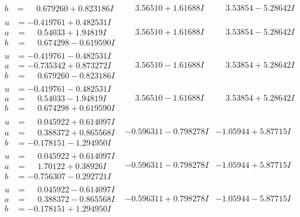 \documentclass[1p]{elsarticle_modified}
\theoremstyle{definition}
\begin{document}
$$\begin{array}{c|c|c}
\begin{aligned}
b &= \phantom{-}0.679260 + 0.823186 I\end{aligned}
 & \phantom{-}3.56510 + 1.61688 I & \phantom{-}3.53854 - 5.28642 I \\ \hline\begin{aligned}
u &= -0.419761 + 0.482531 I \\
a &= \phantom{-}0.54033 + 1.94819 I \\
b &= \phantom{-}0.674298 - 0.619590 I\end{aligned}
 & \phantom{-}3.56510 + 1.61688 I & \phantom{-}3.53854 - 5.28642 I \\ \hline\begin{aligned}
u &= -0.419761 - 0.482531 I \\
a &= -0.735342 + 0.873272 I \\
b &= \phantom{-}0.679260 - 0.823186 I\end{aligned}
 & \phantom{-}3.56510 - 1.61688 I & \phantom{-}3.53854 + 5.28642 I \\ \hline\begin{aligned}
u &= -0.419761 - 0.482531 I \\
a &= \phantom{-}0.54033 - 1.94819 I \\
b &= \phantom{-}0.674298 + 0.619590 I\end{aligned}
 & \phantom{-}3.56510 - 1.61688 I & \phantom{-}3.53854 + 5.28642 I \\ \hline\begin{aligned}
u &= \phantom{-}0.045922 + 0.614097 I \\
a &= \phantom{-}0.388372 + 0.865568 I \\
b &= -0.178151 - 1.294950 I\end{aligned}
 & -0.596311 - 0.798278 I & -1.05944 + 5.87715 I \\ \hline\begin{aligned}
u &= \phantom{-}0.045922 + 0.614097 I \\
a &= \phantom{-}1.70122 + 0.38926 I \\
b &= -0.756307 - 0.292721 I\end{aligned}
 & -0.596311 - 0.798278 I & -1.05944 + 5.87715 I \\ \hline\begin{aligned}
u &= \phantom{-}0.045922 - 0.614097 I \\
a &= \phantom{-}0.388372 - 0.865568 I \\
b &= -0.178151 + 1.294950 I\end{aligned}
 & -0.596311 + 0.798278 I & -1.05944 - 5.87715 I \\ \hline\begin{aligned}

\end{aligned}
\end{array}$$
\end{document}
